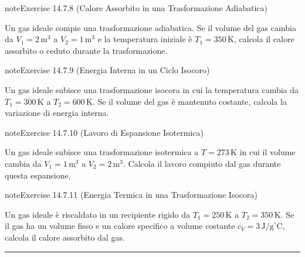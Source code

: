 \documentclass[letterpaper,10pt,italian]{jupyterBook}
\begin{document}
\begin{sphinxadmonition}{note}{Exercise 14.7.8 (Calore Assorbito in una Trasformazione Adiabatica)}



\sphinxAtStartPar
Un gas ideale compie una trasformazione adiabatica. Se il volume del gas cambia da \(V_1 = 2 \, \text{m}^3\) a \(V_2 = 1 \, \text{m}^3\) e la temperatura iniziale è \(T_1 = 350 \, \text{K}\), calcola il calore assorbito o ceduto durante la trasformazione.
\end{sphinxadmonition}
 \label{exercise:ch/thermodynamics/principles-problems-exercise-8}

\begin{sphinxadmonition}{note}{Exercise 14.7.9 (Energia Interna in un Ciclo Isocoro)}



\sphinxAtStartPar
Un gas ideale subisce una trasformazione isocora in cui la temperatura cambia da \(T_1 = 300 \, \text{K}\) a \(T_2 = 600 \, \text{K}\). Se il volume del gas è mantenuto costante, calcola la variazione di energia interna.
\end{sphinxadmonition}
 \label{exercise:ch/thermodynamics/principles-problems-exercise-9}

\begin{sphinxadmonition}{note}{Exercise 14.7.10 (Lavoro di Espansione Isotermica)}



\sphinxAtStartPar
Un gas ideale subisce una trasformazione isotermica a \(T = 273 \, \text{K}\) in cui il volume cambia da \(V_1 = 1 \, \text{m}^3\) a \(V_2 = 2 \, \text{m}^3\). Calcola il lavoro compiuto dal gas durante questa espansione.
\end{sphinxadmonition}
 \label{exercise:ch/thermodynamics/principles-problems-exercise-10}

\begin{sphinxadmonition}{note}{Exercise 14.7.11 (Energia Termica in una Trasformazione Isocora)}



\sphinxAtStartPar
Un gas ideale è riscaldato in un recipiente rigido da \(T_1 = 250 \, \text{K}\) a \(T_2 = 350 \, \text{K}\). Se il gas ha un volume fisso e un calore specifico a volume costante \(c_V = 3 \, \text{J/g}^\circ \text{C}\), calcola il calore assorbito dal gas.
\end{sphinxadmonition}


\bigskip\hrule\bigskip
\end{document}
